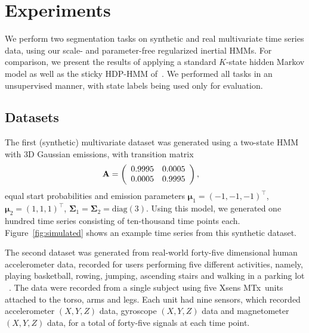 \documentclass[letterpaper]{article}
\begin{document}
\section{Experiments}\label{sec:Experiments}

We perform two segmentation tasks on synthetic and real multivariate time series
data, using our scale- and parameter-free regularized inertial HMMs. For
comparison, we present the results of applying a standard $K$-state hidden
Markov model as well as the sticky HDP-HMM of~\cite{fox2011sticky}. We
performed all tasks in an unsupervised manner, with state labels being used only
for evaluation.

\subsection{Datasets}\label{sec:datasets}

The first (synthetic) multivariate dataset was generated using a two-state HMM with 3D Gaussian emissions, with transition matrix
\begin{align*}
  \setlength{\abovedisplayskip}{0pt}
  \setlength{\belowdisplayskip}{0pt}
    \mathbf{A} &= \left( 
                   \begin{array}{ccc}
                    0.9995 & 0.0005 \\
                    0.0005 & 0.9995
                   \end{array}
                   \right),
\end{align*}
equal start probabilities and emission parameters $\mathbf{\mu}_1 = (-1, -1, -1)^\top$, $\mathbf{\mu}_2 = (1, 1, 1)^\top$, $\mathbf{\Sigma}_1 = \mathbf{\Sigma}_2 = \text{diag}(3)$. Using this model, we generated one hundred time series consisting of ten-thousand time points each. Figure~\ref{fig:simulated} shows an example time series from this synthetic dataset.

The second dataset was generated from real-world forty-five dimensional human accelerometer data, recorded for users performing five different activities, namely, playing basketball, rowing, jumping, ascending stairs and walking in a parking lot ~\cite{Altun:2010:CSC:1823245.1823314}. The data were recorded from a single subject using five Xsens MTx\texttrademark\ units attached to the torso, arms and legs. Each unit had nine sensors, which recorded accelerometer $(X, Y, Z)$ data, gyroscope $(X,Y,Z)$ data and magnetometer $(X,Y,Z)$ data, for a total of forty-five signals at each time point.
\end{document}
